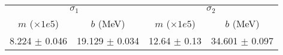 \begin{tabular}{cc|cc}
\multicolumn{2}{c|}{$\sigma_1$} & \multicolumn{2}{|c}{$\sigma_2$} \\
$m$ ($\times1e5$) & $b$ (MeV) & $m$ ($\times1e5$) & $b$ (MeV) \\
\hline
8.224 $\pm$ 0.046 & 19.129 $\pm$ 0.034 & 12.64 $\pm$ 0.13 & 34.601 $\pm$ 0.097\\
\end{tabular}
